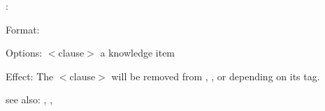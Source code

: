 \rx:

Format: 

Options: $<$clause$>$ a \COLAB{} knowledge item 

Effect: The $<$clause$>$ will be removed from , , 
	 or  depending on its tag.

see also: \consult, \destroy, \replace 
